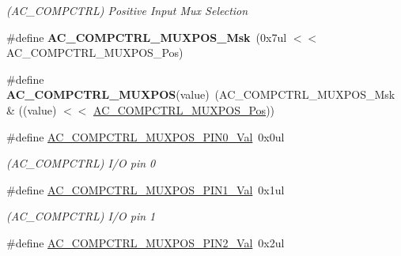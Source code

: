 \begin{DoxyCompactItemize}
\begin{DoxyCompactList}\small\item\em (A\+C\+\_\+\+C\+O\+M\+P\+C\+T\+R\+L) Positive Input Mux Selection \end{DoxyCompactList}\item 
\hypertarget{group___s_a_m_l21___a_c_ga563ff2195d1f198f1329d7f36abb7b4e}{}\#define {\bfseries A\+C\+\_\+\+C\+O\+M\+P\+C\+T\+R\+L\+\_\+\+M\+U\+X\+P\+O\+S\+\_\+\+Msk}~(0x7ul $<$$<$ A\+C\+\_\+\+C\+O\+M\+P\+C\+T\+R\+L\+\_\+\+M\+U\+X\+P\+O\+S\+\_\+\+Pos)\label{group___s_a_m_l21___a_c_ga563ff2195d1f198f1329d7f36abb7b4e}

\item 
\hypertarget{group___s_a_m_l21___a_c_gad1711edb5cdd3e0d22a552aef0bb9f82}{}\#define {\bfseries A\+C\+\_\+\+C\+O\+M\+P\+C\+T\+R\+L\+\_\+\+M\+U\+X\+P\+O\+S}(value)~(A\+C\+\_\+\+C\+O\+M\+P\+C\+T\+R\+L\+\_\+\+M\+U\+X\+P\+O\+S\+\_\+\+Msk \& ((value) $<$$<$ \hyperlink{group___s_a_m_l21___a_c_gad4bb8c36791a0ea8139ae435b00e4365}{A\+C\+\_\+\+C\+O\+M\+P\+C\+T\+R\+L\+\_\+\+M\+U\+X\+P\+O\+S\+\_\+\+Pos}))\label{group___s_a_m_l21___a_c_gad1711edb5cdd3e0d22a552aef0bb9f82}

\item 
\hypertarget{group___s_a_m_l21___a_c_gaa1bfbd8fc89186f1a11a61237e80c4c5}{}\#define \hyperlink{group___s_a_m_l21___a_c_gaa1bfbd8fc89186f1a11a61237e80c4c5}{A\+C\+\_\+\+C\+O\+M\+P\+C\+T\+R\+L\+\_\+\+M\+U\+X\+P\+O\+S\+\_\+\+P\+I\+N0\+\_\+\+Val}~0x0ul\label{group___s_a_m_l21___a_c_gaa1bfbd8fc89186f1a11a61237e80c4c5}

\begin{DoxyCompactList}\small\item\em (A\+C\+\_\+\+C\+O\+M\+P\+C\+T\+R\+L) I/\+O pin 0 \end{DoxyCompactList}\item 
\hypertarget{group___s_a_m_l21___a_c_ga9fb0459c9bcee7f1ecde923e57096492}{}\#define \hyperlink{group___s_a_m_l21___a_c_ga9fb0459c9bcee7f1ecde923e57096492}{A\+C\+\_\+\+C\+O\+M\+P\+C\+T\+R\+L\+\_\+\+M\+U\+X\+P\+O\+S\+\_\+\+P\+I\+N1\+\_\+\+Val}~0x1ul\label{group___s_a_m_l21___a_c_ga9fb0459c9bcee7f1ecde923e57096492}

\begin{DoxyCompactList}\small\item\em (A\+C\+\_\+\+C\+O\+M\+P\+C\+T\+R\+L) I/\+O pin 1 \end{DoxyCompactList}\item 
\hypertarget{group___s_a_m_l21___a_c_ga6e55540b07d767a9d998e64c7d27972b}{}\#define \hyperlink{group___s_a_m_l21___a_c_ga6e55540b07d767a9d998e64c7d27972b}{A\+C\+\_\+\+C\+O\+M\+P\+C\+T\+R\+L\+\_\+\+M\+U\+X\+P\+O\+S\+\_\+\+P\+I\+N2\+\_\+\+Val}~0x2ul\label{group___s_a_m_l21___a_c_ga6e55540b07d767a9d998e64c7d27972b}


\end{DoxyCompactItemize}

